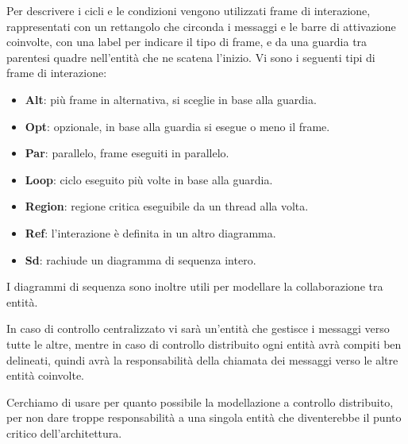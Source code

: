         Per descrivere i cicli e le condizioni vengono utilizzati frame di interazione, rappresentati con un rettangolo che circonda i messaggi e le barre di attivazione coinvolte, con una label per indicare il tipo di frame, e da una guardia tra parentesi quadre nell'entità che ne scatena l'inizio.
        Vi sono i seguenti tipi di frame di interazione:
        \begin{itemize}
            \item \textbf{Alt}: più frame in alternativa, si sceglie in base alla guardia.
            \item \textbf{Opt}: opzionale, in base alla guardia si esegue o meno il frame.
            \item \textbf{Par}: parallelo, frame eseguiti in parallelo.
            \item \textbf{Loop}: ciclo eseguito più volte in base alla guardia.
            \item \textbf{Region}: regione critica eseguibile da un thread alla volta.
            \item \textbf{Ref}: l'interazione è definita in un altro diagramma.
            \item \textbf{Sd}: rachiude un diagramma di sequenza intero.
        \end{itemize}
        I diagrammi di sequenza sono inoltre utili per modellare la collaborazione tra entità.\par
        In caso di controllo centralizzato vi sarà un'entità che gestisce i messaggi verso tutte le altre, mentre in caso di controllo distribuito ogni entità avrà compiti ben delineati, quindi avrà la responsabilità della chiamata dei messaggi verso le altre entità coinvolte.\par
        Cerchiamo di usare per quanto possibile la modellazione a controllo distribuito, per non dare troppe responsabilità a una singola entità che diventerebbe il punto critico dell'architettura.




